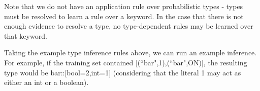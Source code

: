 
Note that we do not have an application rule over probabilistic types - types must be resolved to learn a rule over a keyword.
In the case that there is not enough evidence to resolve a type, no type-dependent rules may be learned over that keyword.


Taking the example type inference rules above, we can run an example inference.
For example, if the training set contained [(``bar",1),(``bar",ON)], the resulting type would be bar::[bool=2,int=1] (considering that the literal 1 may act as either an int or a boolean).

